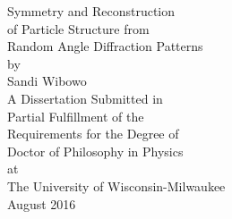 \doublespacing
\thispagestyle{empty}
\begin{center}
{\LARGE Symmetry and Reconstruction \\of Particle Structure from \\Random Angle Diffraction Patterns   }\\[1cm]

by \\[2.5cm]
{\Large Sandi Wibowo}\\[2.5cm]

{\normalsize A Dissertation Submitted in \\ Partial Fulfillment of the \\ Requirements for the Degree of \\[1cm]
Doctor of Philosophy in Physics\\[1cm]
at \\
The University of Wisconsin-Milwaukee \\
August 2016 }
\end{center}
\newpage
